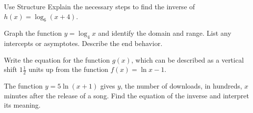 \documentclass{article}
\newenvironment{practice}[2]{}{}        %
\newcommand{\answer}[1]{}               %
\newcommand{\placeholder}[2]{}          %
\newcommand{\uncertain}[2]{#1}          %
\begin{document}
\begin{practice}{4}{\uncertain{not listed}{Item Analysis table begins at item 7}}
Use Structure Explain the necessary steps to find the inverse of $h(x)=\log_6(x+4)$.
\answer{Rewrite the problem using $x$ and $y$, then exchange the places of the $x$ and $y$. Next solve for the $y$. In this step use the relationship between exponential and logarithmic functions. Finally, rewrite in inverse function notation. $h^{-1}(x)=6^x-4$.}
\end{practice}

\begin{practice}{5}{\uncertain{not listed}{Item Analysis table begins at item 7}}
Graph the function $y=\log_4 x$ and identify the domain and range. List any intercepts or asymptotes. Describe the end behavior.
\answer{\begin{tikzpicture}
\begin{axis}[width=6cm,height=5cm,axis lines=middle,xmin=0,xmax=7,ymin=-4,ymax=4,xtick={0,2,4,6},ytick={-4,-2,0,2,4},xlabel={$x$},ylabel={$y$},grid=both]
\addplot[red,thick,domain=0.03:7,samples=100] {ln(x)/ln(4)};
\draw[dashed] (axis cs:0,-4)--(axis cs:0,4) node[pos=0.95,right] {$x=0$};
\end{axis}
\end{tikzpicture}

Domain: $\{x\mid x>0\}$; range: all real numbers; $x$-intercept: 1; asymptote: $y$-axis; end behavior: As $x\to0$, $y\to-\infty$. As $x\to\infty$, $y\to\infty$.}
\end{practice}

\begin{practice}{6}{\uncertain{not listed}{Item Analysis table begins at item 7}}
Write the equation for the function $g(x)$, which can be described as a vertical shift $1\frac12$ units up from the function $f(x)=\ln x-1$.
\answer{$g(x)=\ln x+\frac12$}
\end{practice}

\begin{practice}{7}{2}
The function $y=5\ln(x+1)$ gives $y$, the number of downloads, in hundreds, $x$ minutes after the release of a song. Find the equation of the inverse and interpret its meaning.

\placeholder{illustration}{Download bar labeled "Downloading...", green bar labeled "y downloads", blue bar labeled "x minutes".}
\answer{$x=e^{\frac{y}{5}}-1$; This function gives $x$, the number of minutes after the release of a song, in terms of the number of downloads in hundreds, $y$.}
\end{practice}
\end{document}
